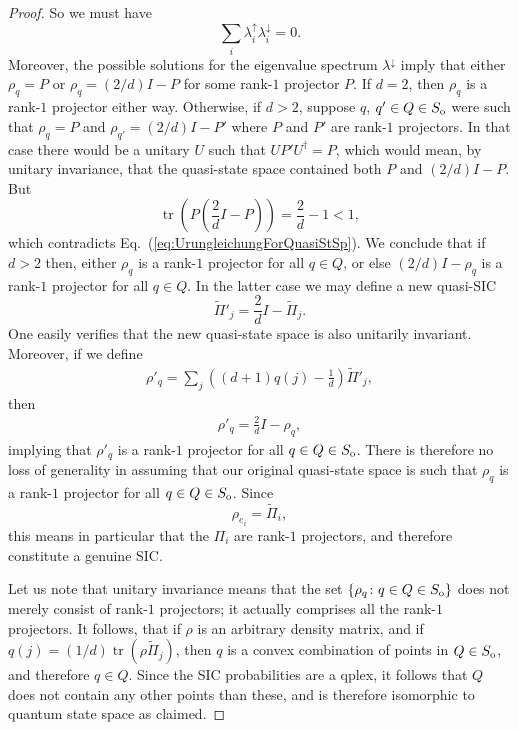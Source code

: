 \documentclass[aps,pra,superscriptaddress,10pt,tightenlines,twocolumn,nofootinbib]{revtex4}
\theoremstyle{remark}
\newcommand{\be}{\begin{equation}}
\newcommand{\ee}{\end{equation}}
\newcommand{\ea}[1]{\begin{align}#1\end{align}}
\newcommand{\so}{S_{\rm{o}}}
\newcommand{\qp}{Q}
\newcommand{\qplex}{qplex}
\DeclareMathOperator{\Tr}{tr}
\begin{document}
\begin{proof}
So we must have
\be
\sum_i \lambda^{\uparrow}_i \lambda^{\downarrow}_i =0.
\ee
Moreover, the possible solutions for the eigenvalue spectrum $\lambda^{\downarrow}$ imply that either $\rho_q  = P$ or $\rho_q = (2/d)I -P$ for some  rank-$1$ projector $P$.  If $d=2$, then $\rho_q$ is a rank-$1$ projector either way.  Otherwise, if $d>2$, suppose $q$, $q'\in \qp\in \so$ were such that $\rho_q = P$ and $ \rho_{q'} = (2/d)I - P'$  where $P$ and $P'$ are rank-$1$ projectors.  In that case there would be a unitary $U$ such that $UP'U^{\dagger} = P$, which would mean, by unitary invariance, that the quasi-state space contained both $P$ and $(2/d)I -P$.  But
\be
\Tr\left(P \left( \frac{2}{d}I - P\right) \right) = \frac{2}{d} - 1 < 1,
\ee
which contradicts  Eq.~(\ref{eq:UrungleichungForQuasiStSp}).  We conclude that if $d>2$ then, either $\rho_q$ is a rank-$1$ projector for all $q\in \qp$, or else $(2/d)I - \rho_q$ is a rank-$1$ projector for all $q\in \qp$.  In the latter case we may define a new quasi-SIC
\be
\tilde{\Pi}'_j = \frac{2}{d}I - \tilde{\Pi}_j.
\ee
One easily verifies that the new quasi-state space is also unitarily invariant.  Moreover, if we define
\ea{
\rho'_q = \sum_j \left( (d+1) q(j) -\frac{1}{d}\right) \tilde{\Pi}'_j,
}
then
\ea{
\rho'_q = \frac{2}{d} I - \rho_q,
}
implying that $\rho'_q$ is a rank-$1$ projector for all $q\in \qp\in \so$.  There is therefore no loss of generality in assuming that our original quasi-state space is such that $\rho_q$ is a rank-$1$ projector for all $q\in \qp\in\so$. Since
\be
\rho_{e_i} = \tilde{\Pi}_i,
\ee
this means in particular that the $\Pi_i$ are rank-$1$ projectors, and therefore constitute a genuine SIC.

Let us note that unitary invariance means that the set $\{\rho_q \colon q \in \qp\in \so\}$ does not merely consist  of rank-$1$ projectors; it actually comprises all the rank-$1$ projectors.   It follows, that if $\rho$ is an arbitrary density matrix, and if $q(j) = (1/d) \Tr(\rho \tilde{\Pi}_j)$, then $q$ is a convex combination of points in $\qp\in \so$, and therefore $q \in \qp$.  Since the SIC probabilities are a \qplex, it follows that $\qp$ does not contain any other points than these, and is therefore isomorphic to quantum state space as claimed.
\end{proof}
\end{document}
